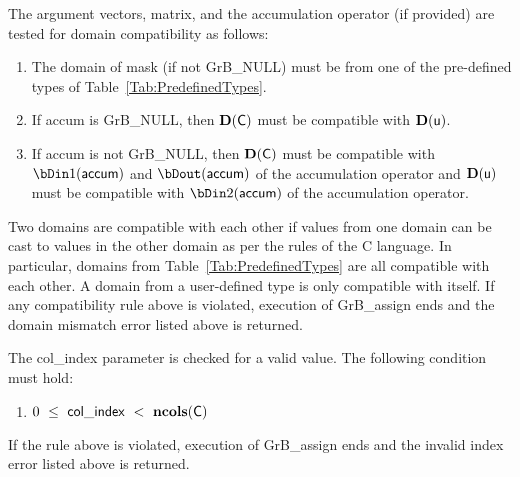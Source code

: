 The argument vectors, matrix, and the accumulation 
operator (if provided) are tested for domain compatibility as follows:
\begin{enumerate}
	\item The domain of {\sf mask} (if not {\sf GrB\_NULL}) must be from one of 
    the pre-defined types of Table~\ref{Tab:PredefinedTypes}.

	\item If {\sf accum} is {\sf GrB\_NULL}, then $\bold{D}({\sf C})$ must be 
    compatible with $\bold{D}({\sf u})$.

	\item If {\sf accum} is not {\sf GrB\_NULL}, then $\bold{D}({\sf C})$ must be
    compatible with $\bDin1({\sf accum})$ and $\bDout({\sf accum})$ of the accumulation operator and 
    $\bold{D}({\sf u})$ must be compatible with $\bDin2({\sf accum})$ of the accumulation operator.
\end{enumerate}
Two domains are compatible with each other if values from one domain can be cast 
to values in the other domain as per the rules of the C language.
In particular, domains from Table~\ref{Tab:PredefinedTypes} are all compatible 
with each other. A domain from a user-defined type is only compatible with itself.
If any compatibility rule above is violated, execution of {\sf GrB\_assign} ends
and the domain mismatch error listed above is returned.

The {\sf col\_index} parameter is checked for a valid value.  The following
condition must hold:
\begin{enumerate}
	\item $0\ \leq\ {\sf col\_index} \ <\ \bold{ncols}({\sf C})$
\end{enumerate}
If the rule above is violated, execution of {\sf GrB\_assign} ends 
and the invalid index error listed above is returned.

